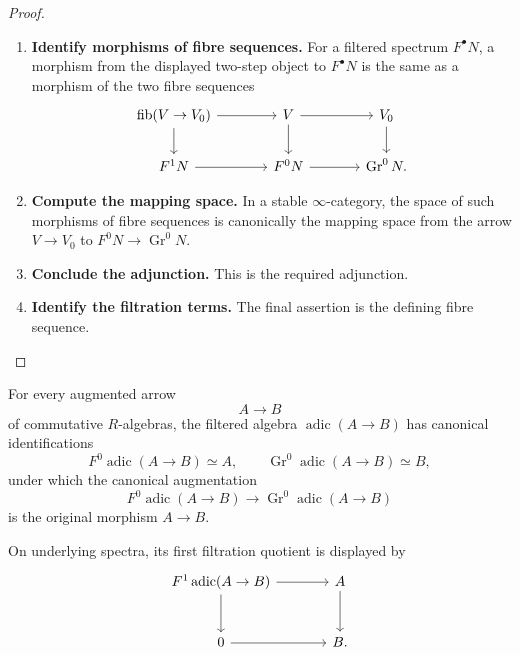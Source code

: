 \begin{proof}
\leavevmode
\begin{enumerate}[label=\textup{(\arabic*)}]
    \item \textbf{Identify morphisms of fibre sequences.}
    For a filtered spectrum \(F^\bullet N\), a morphism from the displayed
    two-step object to \(F^\bullet N\) is the same as a morphism of the two fibre
    sequences
    \[
    \begin{tikzcd}[column sep=large]
        \operatorname{fib}(V\to V_0) \arrow[r] \arrow[d]
            & V \arrow[r] \arrow[d]
            & V_0 \arrow[d]
        \\
        F^1N \arrow[r]
            & F^0N \arrow[r]
            & \operatorname{Gr}^0N.
    \end{tikzcd}
    \]
    \item \textbf{Compute the mapping space.}
    In a stable \(\infty\)-category, the space of such morphisms of fibre sequences
    is canonically the mapping space from the arrow \(V\to V_0\) to
    \(F^0N\to\operatorname{Gr}^0N\).
    \item \textbf{Conclude the adjunction.}
    This is the required adjunction.
    \item \textbf{Identify the filtration terms.}
    The final
    assertion is the defining fibre sequence.
\end{enumerate}
\end{proof}

\begin{proposition}
\label{prop:adic-recovers-augmentation}
For every augmented arrow
\[
    A\longrightarrow B
\]
of commutative \(R\)-algebras, the filtered algebra
\(\operatorname{adic}(A\to B)\) has canonical identifications
\[
    F^0\operatorname{adic}(A\to B)\simeq A,
    \qquad
    \operatorname{Gr}^0\operatorname{adic}(A\to B)\simeq B,
\]
under which the canonical augmentation
\[
    F^0\operatorname{adic}(A\to B)
    \longrightarrow
    \operatorname{Gr}^0\operatorname{adic}(A\to B)
\]
is the original morphism \(A\to B\).

On underlying spectra, its first filtration quotient is displayed by
\[
\begin{tikzcd}[column sep=large,row sep=large]
    F^1\operatorname{adic}(A\to B) \arrow[r] \arrow[d]
        & A \arrow[d]
    \\
    0 \arrow[r]
        & B .
\end{tikzcd}
\]
\end{proposition}

